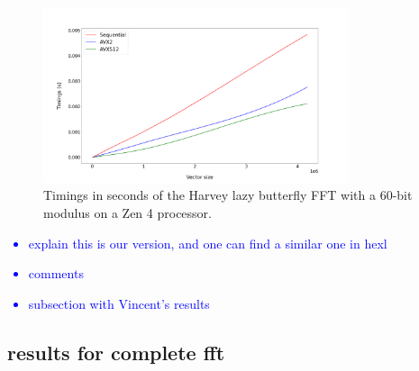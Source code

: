 \documentclass[a4paper]{article}
\begin{document}
\begin{figure}[h!]
    \begin{center}
        \includegraphics[width=0.8\textwidth]{lazy-butterfly_argiope.png}
    \end{center}
    \caption{Timings in seconds of the Harvey lazy butterfly FFT with a 60-bit modulus on a Zen 4 processor.}
\end{figure}

\newpage
\textcolor{blue}{
    \begin{itemize}
        \item explain this is our version, and one can find a similar one in hexl
        \item  comments
        \item subsection with Vincent's results
    \end{itemize}
}

\subsection{results for complete fft}

\end{document}
